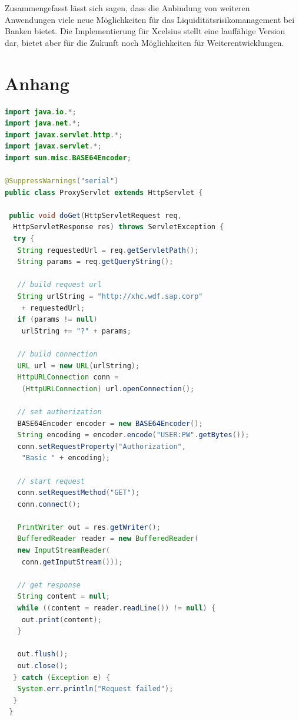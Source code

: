\begin{onehalfspacing}
Zusammengefasst lässt sich sagen, dass die Anbindung von weiteren Anwendungen viele neue Möglichkeiten für das Liquiditätsrisikomanagement bei Banken bietet. Die Implementierung für Xcelsius stellt eine lauffähige Version dar, bietet aber für die Zukunft noch Möglichkeiten für Weiterentwicklungen.












\end{onehalfspacing}


\seAppendix{}

\setcounter{page}{8}


\chapter{Anhang}

\begin{lstlisting}[language=Java]
import java.io.*;
import java.net.*;
import javax.servlet.http.*;
import javax.servlet.*;
import sun.misc.BASE64Encoder;

@SuppressWarnings("serial")
public class ProxyServlet extends HttpServlet {

 public void doGet(HttpServletRequest req, 
  HttpServletResponse res) throws ServletException {
  try {
   String requestedUrl = req.getServletPath();
   String params = req.getQueryString();

   // build request url
   String urlString = "http://xhc.wdf.sap.corp"
    + requestedUrl;
   if (params != null)
    urlString += "?" + params;

   // build connection
   URL url = new URL(urlString);
   HttpURLConnection conn =
    (HttpURLConnection) url.openConnection();

   // set authorization
   BASE64Encoder encoder = new BASE64Encoder();
   String encoding = encoder.encode("USER:PW".getBytes());
   conn.setRequestProperty("Authorization",
    "Basic " + encoding);

   // start request
   conn.setRequestMethod("GET");
   conn.connect();

   PrintWriter out = res.getWriter();
   BufferedReader reader = new BufferedReader(
   new InputStreamReader(
    conn.getInputStream()));

   // get response
   String content = null;
   while ((content = reader.readLine()) != null) {
    out.print(content);
   }

   out.flush();
   out.close();
  } catch (Exception e) {
   System.err.println("Request failed");
  }  
 }
\end{lstlisting}

